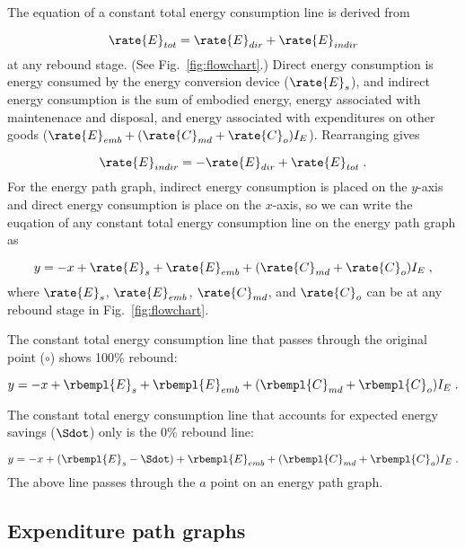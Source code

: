 The equation of a constant total energy consumption line is derived from 

\begin{equation}
  \rate{E}_{tot} = \rate{E}_{dir} + \rate{E}_{indir}
\end{equation}
%
at any rebound stage. (See Fig.~\ref{fig:flowchart}.)
Direct energy consumption is energy consumed by the energy conversion device
($\rate{E}_s$), and 
indirect energy consumption is the sum of embodied energy, 
energy associated with maintenenace and disposal, and energy associated 
with expenditures on other goods
($\rate{E}_{emb} + (\rate{C}_{md} + \rate{C}_o) I_E$).
Rearranging gives

\begin{equation}
  \rate{E}_{indir} = - \rate{E}_{dir} + \rate{E}_{tot} \; .
\end{equation}
%
For the energy path graph, 
indirect energy consumption is placed on the $y$-axis
and direct energy consumption is place on the $x$-axis, 
so we can write the euqation of any 
constant total energy consumption line on the energy path graph as

\begin{equation}
  y = -x + \rate{E}_s + \rate{E}_{emb} + (\rate{C}_{md} + \rate{C}_o) I_E \; ,
\end{equation}
%
where $\rate{E}_s$, $\rate{E}_{emb}$, $\rate{C}_{md}$, and $\rate{C}_o$
can be at any rebound stage in Fig.~\ref{fig:flowchart}.

The constant total energy consumption line 
that passes through the original point ($\circ$)
shows 100\% rebound:

\begin{equation}
  y = -x + \rbempl{E}_s + \rbempl{E}_{emb} + (\rbempl{C}_{md} + \rbempl{C}_o) I_E \; .
\end{equation}

The constant total energy consumption line 
that accounts for expected energy savings ($\Sdot$) only 
is the 0\% rebound line:

\begin{equation}
  y = -x + (\rbempl{E}_s - \Sdot)
          + \rbempl{E}_{emb} + (\rbempl{C}_{md} + \rbempl{C}_o) I_E \; .
\end{equation}
%
The above line passes through the $a$ point on an energy path graph.


\subsection{Expenditure path graphs}
\label{sec:expenditure_path_graph_details}

